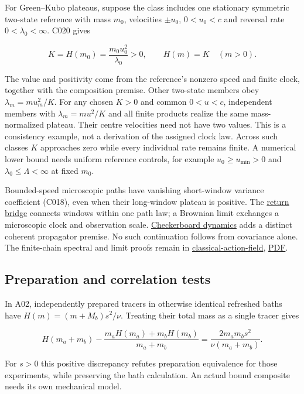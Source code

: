 \documentclass[11pt,a4paper]{article}
\begin{document}
For Green--Kubo plateaus, suppose the class includes one stationary
symmetric two-state reference with mass \(m_0\), velocities \(\pm u_0\),
\(0<u_0<c\) and reversal rate \(0<\lambda_0<\infty\). C020 gives

\[\boxed{K=H(m_0)=\frac{m_0u_0^2}{\lambda_0}>0,
\qquad H(m)=K\quad(m>0).}\]

The value and positivity come from the reference's nonzero speed and
finite clock, together with the composition premise. Other two-state
members obey \(\lambda_m=mu_m^2/K\). For any chosen \(K>0\) and common
\(0<u<c\), independent members with \(\lambda_m=mu^2/K\) and all finite
products realize the same mass-normalized plateau. Their centre
velocities need not have two values. This is a consistency example, not
a derivation of the assigned clock law. Across such classes \(K\)
approaches zero while every individual rate remains finite. A numerical
lower bound needs uniform reference controls, for example
\(u_0\ge u_{\min}>0\) and \(\lambda_0\le\Lambda<\infty\) at fixed
\(m_0\).

Bounded-speed microscopic paths have vanishing short-window variance
coefficient (C018), even when their long-window plateau is positive. The
\href{telegraph-return-bridge.md}{return bridge} connects windows within
one path law; a Brownian limit exchanges a microscopic clock and
observation scale. \href{checkerboard-dynamics.md}{Checkerboard
dynamics} adds a distinct coherent propagator premise. No such
continuation follows from covariance alone. The finite-chain spectral
and limit proofs remain in
\href{../papers/classical-action-field.tex}{classical-action-field},
\href{../out/papers/classical-action-field.pdf}{PDF}.

\hypertarget{preparation-and-correlation-tests}{%
\subsection{Preparation and correlation
tests}\label{preparation-and-correlation-tests}}

In A02, independently prepared tracers in otherwise identical refreshed
baths have \(H(m)=(m+M_b)s^2/\nu\). Treating their total mass as a
single tracer gives

\[H(m_a+m_b)-\frac{m_aH(m_a)+m_bH(m_b)}{m_a+m_b}
 =\frac{2m_am_bs^2}{\nu(m_a+m_b)}.\]

For \(s>0\) this positive discrepancy refutes preparation equivalence
for those experiments, while preserving the bath calculation. An actual
bound composite needs its own mechanical model.
\end{document}
